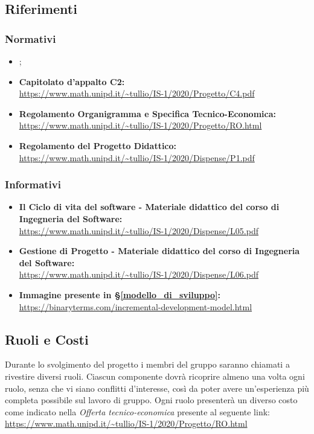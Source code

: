 \subsection{Riferimenti}
\subsubsection{Normativi}
\begin{itemize}
    \item \textit{\NdP};
    \item \textbf{Capitolato d'appalto C2:}\\
    \url{https://www.math.unipd.it/~tullio/IS-1/2020/Progetto/C4.pdf}
    \item \textbf{Regolamento Organigramma e Specifica Tecnico-Economica:}\\
    \url{https://www.math.unipd.it/~tullio/IS-1/2020/Progetto/RO.html}
    \item \textbf{Regolamento del Progetto Didattico:}\\
    \url{https://www.math.unipd.it/~tullio/IS-1/2020/Dispense/P1.pdf}
\end{itemize}

\subsubsection{Informativi}
\begin{itemize}
    \item \textbf{Il Ciclo di vita del software - Materiale didattico del corso di Ingegneria del Software:}\\
    \url{https://www.math.unipd.it/~tullio/IS-1/2020/Dispense/L05.pdf}
    \item \textbf{Gestione di Progetto - Materiale didattico del corso di Ingegneria del Software:}\\
    \url{https://www.math.unipd.it/~tullio/IS-1/2020/Dispense/L06.pdf}
    \item \textbf{Immagine presente in \S\ref{modello_di_sviluppo}:} \\
    \url{https://binaryterms.com/incremental-development-model.html}
\end{itemize}

\subsection{Ruoli e Costi}%
Durante lo svolgimento del progetto i membri del gruppo {\Gruppo} saranno chiamati a rivestire diversi ruoli. Ciascun componente dovrà ricoprire almeno una volta ogni ruolo, senza che vi siano conflitti d'interesse, così da poter avere un'esperienza più completa possibile sul lavoro di gruppo. Ogni ruolo presenterà un diverso costo come indicato nella \textit{Offerta tecnico-economica} presente al seguente link: \url{https://www.math.unipd.it/~tullio/IS-1/2020/Progetto/RO.html}

